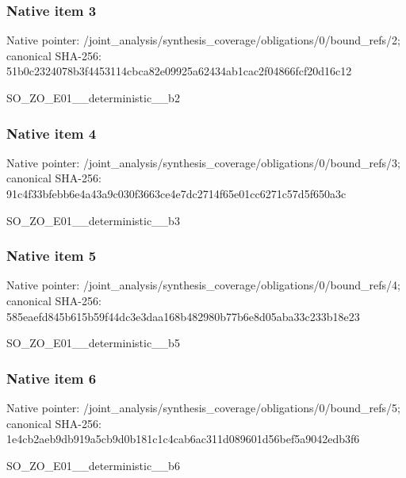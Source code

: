 \documentclass[10pt,a4paper]{article}
\begin{document}
\subsubsection{Native item 3}
Native pointer: /joint\_\allowbreak{}analysis/synthesis\_\allowbreak{}coverage/obligations/0/bound\_\allowbreak{}refs/2; canonical SHA-256: 51b0c2324078b3f4453114cbca82e09925a62434ab1cac2f04866fcf20d16c12

\begingroup\raggedright\sloppy SO\_\allowbreak{}ZO\_\allowbreak{}E01\_\allowbreak{}\_\allowbreak{}deterministic\_\allowbreak{}\_\allowbreak{}b2\par\endgroup

\subsubsection{Native item 4}
Native pointer: /joint\_\allowbreak{}analysis/synthesis\_\allowbreak{}coverage/obligations/0/bound\_\allowbreak{}refs/3; canonical SHA-256: 91c4f33bfebb6e4a43a9c030f3663ce4e7dc2714f65e01cc6271c57d5f650a3c

\begingroup\raggedright\sloppy SO\_\allowbreak{}ZO\_\allowbreak{}E01\_\allowbreak{}\_\allowbreak{}deterministic\_\allowbreak{}\_\allowbreak{}b3\par\endgroup

\subsubsection{Native item 5}
Native pointer: /joint\_\allowbreak{}analysis/synthesis\_\allowbreak{}coverage/obligations/0/bound\_\allowbreak{}refs/4; canonical SHA-256: 585eaefd845b615b59f44dc3e3daa168b482980b77b6e8d05aba33c233b18e23

\begingroup\raggedright\sloppy SO\_\allowbreak{}ZO\_\allowbreak{}E01\_\allowbreak{}\_\allowbreak{}deterministic\_\allowbreak{}\_\allowbreak{}b5\par\endgroup

\subsubsection{Native item 6}
Native pointer: /joint\_\allowbreak{}analysis/synthesis\_\allowbreak{}coverage/obligations/0/bound\_\allowbreak{}refs/5; canonical SHA-256: 1e4cb2aeb9db919a5cb9d0b181c1c4cab6ac311d089601d56bef5a9042edb3f6

\begingroup\raggedright\sloppy SO\_\allowbreak{}ZO\_\allowbreak{}E01\_\allowbreak{}\_\allowbreak{}deterministic\_\allowbreak{}\_\allowbreak{}b6\par\endgroup
\end{document}
